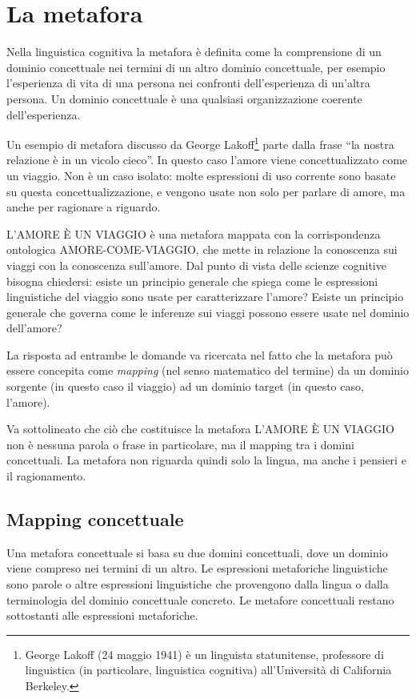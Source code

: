 \chapter{La metafora}
Nella linguistica cognitiva la metafora è definita come la comprensione di un dominio concettuale nei termini di un altro dominio concettuale, per esempio l'esperienza di vita di una persona nei confronti dell'esperienza di un'altra persona. Un dominio concettuale è una qualsiasi organizzazione coerente dell’esperienza.

Un esempio di metafora discusso da George Lakoff\footnote{George Lakoff (24 maggio 1941) è un linguista statunitense, professore di linguistica (in particolare, linguistica cognitiva) all'Università di California Berkeley.} parte dalla frase ``la nostra relazione è in un vicolo cieco''. In questo caso l’amore viene concettualizzato come un viaggio. Non è un caso isolato: molte espressioni di uso corrente sono basate su questa concettualizzazione, e vengono usate non solo per parlare di amore, ma anche per ragionare a riguardo.

L'AMORE È UN VIAGGIO è una metafora mappata con la corrispondenza ontologica AMORE-COME-VIAGGIO, che mette in relazione la conoscenza sui viaggi con la conoscenza sull’amore. Dal punto di vista delle scienze cognitive bisogna chiedersi: esiste un principio generale che spiega come le espressioni linguistiche del viaggio sono usate per caratterizzare l’amore? Esiste un principio generale che governa come le inferenze sui viaggi possono essere usate nel dominio dell’amore?

La risposta ad entrambe le domande va ricercata nel fatto che la metafora può essere concepita come \emph{mapping} (nel senso matematico del termine) da un dominio sorgente (in questo caso il viaggio) ad un dominio target (in questo caso, l’amore).

Va sottolineato che ciò che costituisce la metafora L’AMORE È UN VIAGGIO non è nessuna parola o frase in particolare, ma il mapping tra i domini concettuali. La metafora non riguarda quindi solo la lingua, ma anche i pensieri e il ragionamento.

\section{Mapping concettuale}
Una metafora concettuale si basa su due domini concettuali, dove un dominio viene compreso nei termini di un altro. Le espressioni metaforiche linguistiche sono parole o altre espressioni linguistiche che provengono dalla lingua o dalla terminologia del dominio concettuale concreto. Le metafore concettuali restano sottostanti alle espressioni metaforiche. 

